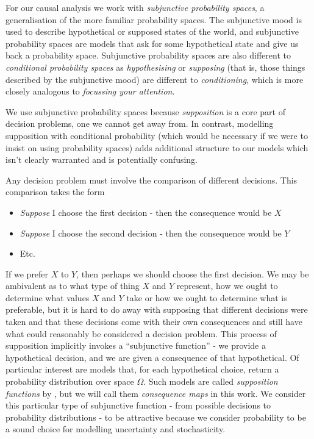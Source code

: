 For our causal analysis we work with \emph{subjunctive probability spaces}, a generalisation of the more familiar probability spaces. The subjunctive mood is used to describe hypothetical or supposed states of the world, and subjunctive probability spaces are models that ask for some hypothetical state and give us back a probability space. Subjunctive probability spaces are also different to \emph{conditional probability spaces} \citet{renyi_conditional_1956} as \emph{hypothesising} or \emph{supposing} (that is, those things described by the subjunctive mood) are different to \emph{conditioning}, which is more closely analogous to \emph{focussing your attention}.

We use subjunctive probability spaces because \emph{supposition} is a core part of decision problems, one we cannot get away from. In contrast, modelling supposition with conditional probability (which would be necessary if we were to insist on using probability spaces) adds additional structure to our models which isn't clearly warranted and is potentially confusing.

Any decision problem must involve the comparison of different decisions. This comparison takes the form
\begin{itemize}
	\item \emph{Suppose} I choose the first decision - then the consequence would be $X$
	\item \emph{Suppose} I choose the second decision - then the consequence would be $Y$
	\item Etc.
\end{itemize}

If we prefer $X$ to $Y$, then perhaps we should choose the first decision. We may be ambivalent as to what type of thing $X$ and $Y$ represent, how we ought to determine what values $X$ and $Y$ take or how we ought to determine what is preferable, but it is hard to do away with supposing that different decisions were taken and that these decisions come with their own consequences and still have what could reasonably be considered a decision problem. This process of supposition implicitly invokes a ``subjunctive function'' - we provide a hypothetical decision, and we are given a consequence of that hypothetical. Of particular interest are models that, for each hypothetical choice, return a probability distribution over space $\Omega$. Such models are called \emph{supposition functions} by \citet{joyce_why_2000}, but we will call them \emph{consequence maps} in this work. We consider this particular type of subjunctive function - from possible decisions to probability distributions - to be attractive because we consider probability to be a sound choice for modelling uncertainty and stochasticity.


